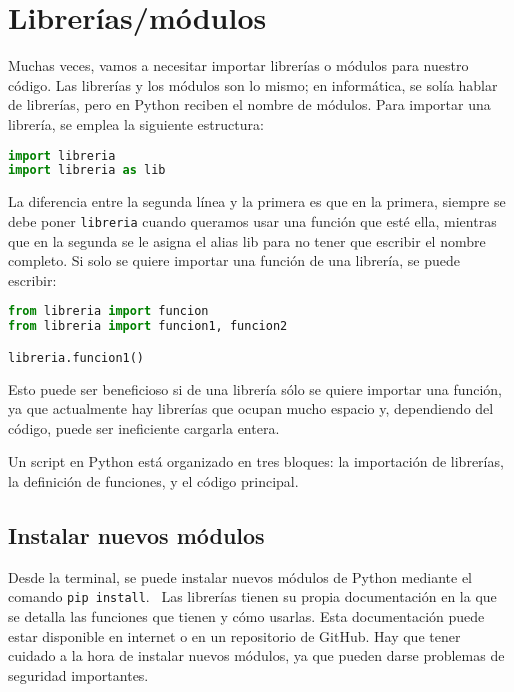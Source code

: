 \section{Librerías/módulos}
Muchas veces, vamos a necesitar importar librerías o módulos para nuestro código. Las librerías y los módulos son lo mismo; en informática, se solía hablar de librerías, pero en Python reciben el nombre de módulos. Para importar una librería, se emplea la siguiente estructura:
\begin{lstlisting}[language=Python]
import libreria
import libreria as lib
\end{lstlisting}
La diferencia entre la segunda línea y la primera es que en la primera, siempre se debe poner \texttt{libreria} cuando queramos usar una función que esté ella, mientras que en la segunda se le asigna el alias lib para no tener que escribir el nombre completo. Si solo se quiere importar una función de una librería, se puede escribir:
\begin{lstlisting}[language=Python]
from libreria import funcion
from libreria import funcion1, funcion2

libreria.funcion1()
\end{lstlisting}
Esto puede ser beneficioso si de una librería sólo se quiere importar una función, ya que actualmente hay librerías que ocupan mucho espacio y, dependiendo del código, puede ser ineficiente cargarla entera. 

\begin{table}[htbp]
\begin{mdframed}[backgroundcolor=black!10]
    \centering
    Un script en Python está organizado en tres bloques: la importación de librerías, la definición de funciones, y el código principal.
    \end{mdframed}
\end{table}

\subsection{Instalar nuevos módulos}
Desde la terminal, se puede instalar nuevos módulos de Python mediante el comando \texttt{pip install}.   \ Las librerías tienen su propia documentación en la que se detalla las funciones que tienen y cómo usarlas. Esta documentación puede estar disponible en internet o en un repositorio de GitHub. Hay que tener cuidado a la hora de instalar nuevos módulos, ya que pueden darse problemas de seguridad importantes. 

